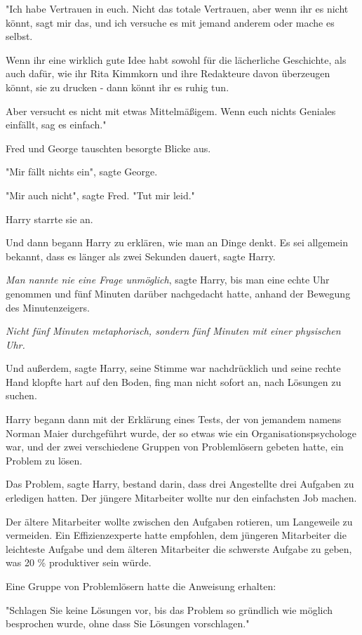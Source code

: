 {"Ich habe Vertrauen in euch. Nicht das totale Vertrauen, aber wenn ihr es nicht könnt, sagt mir das, und ich versuche es mit jemand anderem oder mache es selbst.

Wenn ihr eine wirklich gute Idee habt sowohl für die lächerliche Geschichte, als auch dafür, wie ihr Rita Kimmkorn und ihre Redakteure davon überzeugen könnt, sie zu drucken - dann könnt ihr es ruhig tun.

Aber versucht es nicht mit etwas Mittelmäßigem. Wenn euch nichts Geniales einfällt, sag es einfach."

Fred und George tauschten besorgte Blicke aus.

"Mir fällt nichts ein", sagte George.

"Mir auch nicht", sagte Fred. "Tut mir leid."

Harry starrte sie an.

Und dann begann Harry zu erklären, wie man an Dinge denkt. Es sei allgemein bekannt, dass es länger als zwei Sekunden dauert, sagte Harry.

\emph{Man nannte nie eine Frage unmöglich}, sagte Harry, bis man eine echte Uhr genommen und fünf Minuten darüber nachgedacht hatte, anhand der Bewegung des Minutenzeigers.

\emph{Nicht fünf Minuten metaphorisch, sondern fünf Minuten mit einer physischen Uhr.}

Und außerdem, sagte Harry, seine Stimme war nachdrücklich und seine rechte Hand klopfte hart auf den Boden, fing man nicht sofort an, nach Lösungen zu suchen.

Harry begann dann mit der Erklärung eines Tests, der von jemandem namens Norman Maier durchgeführt wurde, der so etwas wie ein Organisationspsychologe war, und der zwei verschiedene Gruppen von Problemlösern gebeten hatte, ein Problem zu lösen.

Das Problem, sagte Harry, bestand darin, dass drei Angestellte drei Aufgaben zu erledigen hatten. Der jüngere Mitarbeiter wollte nur den einfachsten Job machen.

Der ältere Mitarbeiter wollte zwischen den Aufgaben rotieren, um Langeweile zu vermeiden. Ein Effizienzexperte hatte empfohlen, dem jüngeren Mitarbeiter die leichteste Aufgabe und dem älteren Mitarbeiter die schwerste Aufgabe zu geben, was 20 \% produktiver sein würde.

Eine Gruppe von Problemlösern hatte die Anweisung erhalten:

"Schlagen Sie keine Lösungen vor, bis das Problem so gründlich wie möglich besprochen wurde, ohne dass Sie Lösungen vorschlagen."

}
